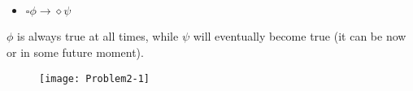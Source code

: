 \subsection{}

\begin{itemize}
   \item[] $\square \phi \rightarrow \diamond \psi$ 
\end{itemize}

\indent $\phi$ is always true at all times, while $\psi$ will eventually become true (it can be now or in some future moment).

\begin{figure}[h!]
	\centering \texttt{[image: Problem2-1]}
\end{figure}
